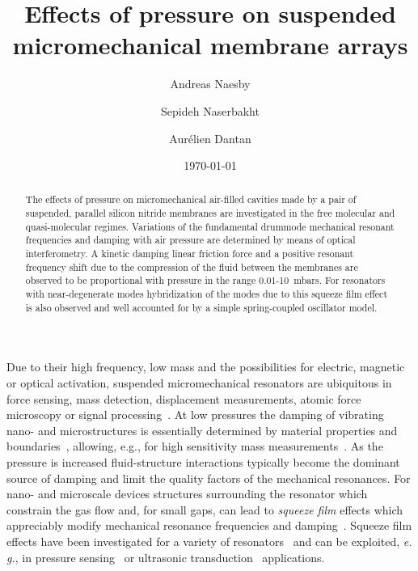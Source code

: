 \documentclass[pra,twocolumn,superscriptaddress,notitlepage]{revtex4-1}
\begin{document}
\title{Effects of pressure on suspended micromechanical membrane arrays}

\author{Andreas Naesby}
\author{Sepideh Naserbakht}
\author{Aur\'{e}lien Dantan}

\date{\today}

\begin{abstract}
The effects of pressure on micromechanical air-filled cavities made by a pair of suspended, parallel silicon nitride membranes are investigated in the free molecular and quasi-molecular regimes. Variations of the fundamental drummode mechanical resonant frequencies and damping with air pressure are determined by means of optical interferometry. A kinetic damping linear friction force and a positive resonant frequency shift due to the compression of the fluid between the membranes are observed to be proportional with pressure in the range 0.01-10~mbars. For resonators with near-degenerate modes hybridization of the modes due to this squeeze film effect is also observed and well accounted for by a simple spring-coupled oscillator model.
\end{abstract}


\maketitle

Due to their high frequency, low mass and the possibilities for electric, magnetic or optical activation, suspended micromechanical resonators are ubiquitous in force sensing, mass detection, displacement measurements, atomic force microscopy or signal processing~\cite{Bao2000,Ekinci2005,Aspelmeyer2014}. At low pressures the damping of vibrating nano- and microstructures is essentially determined by material properties and boundaries~\cite{Joshi2014}, allowing, e.g., for high sensitivity mass measurements~\cite{Ilic2004,Yang2006}. As the pressure is increased fluid-structure interactions typically become the dominant source of damping and limit the quality factors of the mechanical resonances. For nano- and microscale devices structures surrounding the resonator which constrain the gas flow and, for small gaps, can lead to \textit{squeeze film} effects which appreciably modify mechanical resonance frequencies and damping~\cite{Bao2007}. Squeeze film effects have been investigated for a variety of resonators~\cite{Andrews1993a,Darling1998,Bao2007,Verbridge2008,Okada2008,Suijlen2009,Stifter2012} and can be exploited, {\it  e. g.}, in pressure sensing~\cite{Andrews1993b,Southworth2009,Kainz2014,Kumar2015} or ultrasonic transduction~\cite{Hansen1999,Wygant2008,KhuriYakub2011} applications.
\end{document}

